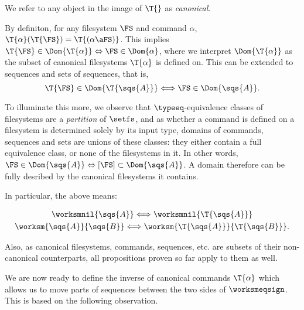 We refer to any object in the image of $\T{}$ as \emph{canonical}.

By definiton, for any filesystem $\FS$ and command $\alpha$, 
$\T{\alpha}(\T{\FS}) = \T{(\alpha\aFS)}$.
This implies $\T{\FS}\in\Dom{\T{\alpha}} \Leftrightarrow \FS\in\Dom{\alpha}$,
where we interpret $\Dom{\T{\alpha}}$ as the subset of canonical filesystems $\T{\alpha}$ is defined on.
This can be extended to sequences and sets of sequences, that is,
\[ \T{\FS}\in\Dom{\T{\sqs{A}}} \Longleftrightarrow \FS\in\Dom{\sqs{A}}. \]

To illuminate this more, we observe
that $\typeeq$-equivalence classes of filesystems are a \emph{partition} of $\setfs$,
and as whether a command is defined on a filesystem is determined solely by its input type,
domains of commands, sequences and sets are unions of these classes:
they either contain a full equivalence class, or none of the filesystems in it.
In other words, $\FS\in\Dom{\sqs{A}} \Leftrightarrow [\FS] \subset \Dom{\sqs{A}}$.
A domain therefore can be fully desribed by the canonical filesystems it contains.

In particular, the above means:

\begin{myclm}
\begin{gather*}
\worksmnil{\sqs{A}} \Longleftrightarrow \worksmnil{\T{\sqs{A}}} \\
\worksm{\sqs{A}}{\sqs{B}} \Longleftrightarrow \worksm{\T{\sqs{A}}}{\T{\sqs{B}}}.
\end{gather*}
\end{myclm}



Also, as canonical filesystems, commands, sequences, etc.
are subsets of their non-canonical counterparts, 
all propositions proven so far apply to them as well.




\bigskip

\noindent We are now ready to define the inverse of canonical commands $\T{\alpha}$
which allows us to move parts of sequences between the
two sides of $\worksmeqsign$.
This is based on the following observation.


